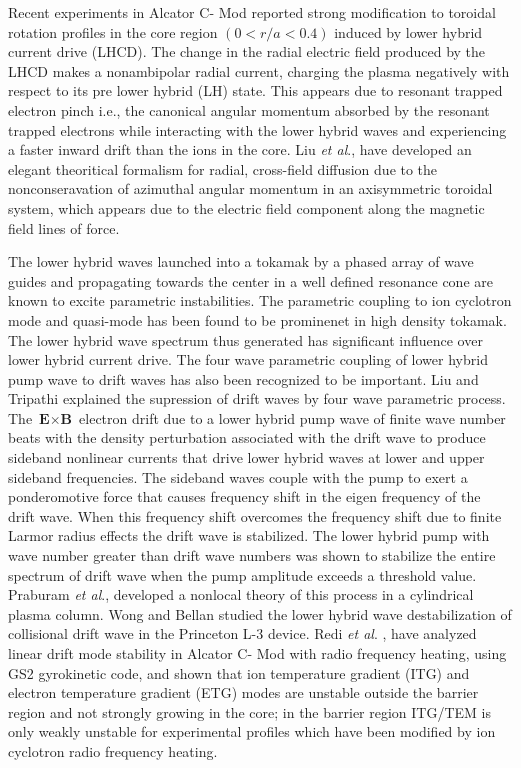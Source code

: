 \documentclass[aip,pop,amsmath,amssymb,showpacs,reprint,floatfix,lengthcheck]{revtex4-1}
\begin{document}
Recent experiments in Alcator C- Mod \cite{PhysRevLett.102.035002,rice2009observations} reported strong modification to toroidal rotation profiles in the core region $(0<r/a<0.4)$ induced by lower hybrid current drive (LHCD). The change in the radial electric field produced by the LHCD makes a nonambipolar radial current, charging the plasma negatively with respect to its pre lower hybrid (LH) state. This appears due to resonant trapped electron pinch i.e., the canonical angular momentum absorbed by the resonant trapped electrons while interacting with the lower hybrid waves and experiencing a faster inward drift than the ions in the core. Liu \textit{et al}., \cite{PhysRevLett.26.621} have developed an elegant theoritical formalism for radial, cross-field diffusion due to the nonconseravation of azimuthal angular momentum in an axisymmetric toroidal system, which appears due to the electric field component along the magnetic field lines of force. 

The lower hybrid waves launched into a tokamak by a phased array of wave guides and propagating towards the center in a well defined resonance cone are known to excite parametric instabilities. The parametric coupling to ion cyclotron mode and quasi-mode has been found to be  prominenet in high density tokamak. The lower hybrid wave spectrum thus generated has significant influence over lower hybrid current drive. The four wave parametric coupling of lower hybrid pump wave to drift waves has also been recognized to be important. Liu and Tripathi \cite{liu1980stabilization} explained the supression of drift waves by four wave parametric process. The $\textbf{E}\times \textbf{B}$ electron drift due to a lower hybrid pump wave of finite wave number beats with the density perturbation associated with the drift wave to produce sideband nonlinear currents that drive lower hybrid waves at lower and upper sideband frequencies. The sideband waves couple with the pump to exert a ponderomotive force that causes frequency shift in the eigen frequency of the drift wave. When this frequency shift overcomes the frequency shift due to finite Larmor radius effects the drift wave is stabilized. The lower hybrid pump with wave number greater than drift wave numbers was shown to stabilize the entire spectrum of drift wave when the pump amplitude exceeds a threshold value. Praburam \textit{et al}., \cite{praburam1988lower} developed a nonlocal theory of this process in a cylindrical plasma column. Wong and Bellan \cite{wong1978enhancement} studied the lower hybrid wave destabilization of collisional drift wave in the Princeton L-3 device. Redi \textit{et al}. \cite{redi2005microturbulent}, have analyzed linear drift mode stability in Alcator C- Mod with radio frequency heating, using GS2 gyrokinetic code, and shown that  ion temperature gradient (ITG) and electron temperature gradient (ETG) modes are unstable outside the barrier region and not strongly growing in the core; in the barrier region ITG/TEM is only weakly unstable for experimental profiles which have been modified by ion cyclotron radio frequency heating.
\end{document}
